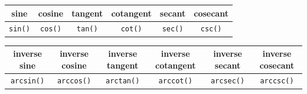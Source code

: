 \documentclass[]{book}
\theoremstyle{definition}
\theoremstyle{definition}
\theoremstyle{definition}
\theoremstyle{remark}
\begin{document}
\begin{longtable}[]{@{}cccccc@{}}
\toprule
sine & cosine & tangent & cotangent & secant & cosecant\tabularnewline
\midrule
\endhead
\texttt{sin()} & \texttt{cos()} & \texttt{tan()} & \texttt{cot()} & \texttt{sec()} & \texttt{csc()}\tabularnewline
\bottomrule
\end{longtable}

\begin{longtable}[]{@{}cccccc@{}}
\toprule
\begin{minipage}[b]{0.13\columnwidth}\centering
inverse sine\strut
\end{minipage} & \begin{minipage}[b]{0.13\columnwidth}\centering
inverse cosine\strut
\end{minipage} & \begin{minipage}[b]{0.13\columnwidth}\centering
inverse tangent\strut
\end{minipage} & \begin{minipage}[b]{0.16\columnwidth}\centering
inverse cotangent\strut
\end{minipage} & \begin{minipage}[b]{0.13\columnwidth}\centering
inverse secant\strut
\end{minipage} & \begin{minipage}[b]{0.15\columnwidth}\centering
inverse cosecant\strut
\end{minipage}\tabularnewline
\midrule
\endhead
\begin{minipage}[t]{0.13\columnwidth}\centering
\texttt{arcsin()}\strut
\end{minipage} & \begin{minipage}[t]{0.13\columnwidth}\centering
\texttt{arccos()}\strut
\end{minipage} & \begin{minipage}[t]{0.13\columnwidth}\centering
\texttt{arctan()}\strut
\end{minipage} & \begin{minipage}[t]{0.16\columnwidth}\centering
\texttt{arccot()}\strut
\end{minipage} & \begin{minipage}[t]{0.13\columnwidth}\centering
\texttt{arcsec()}\strut
\end{minipage} & \begin{minipage}[t]{0.15\columnwidth}\centering
\texttt{arccsc()}\strut
\end{minipage}\tabularnewline
\bottomrule
\end{longtable}
\end{document}
